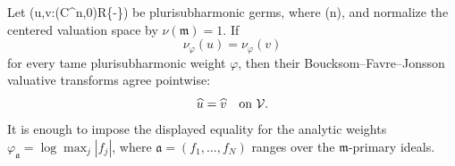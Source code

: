 Let (u,v:(\mathbf C^n,0)\to\mathbf R\cup\{-\infty\}) be
plurisubharmonic germs, where (n), and normalize the centered
valuation space by \(\nu(\mathfrak m)=1\).  If
\[
              \nu_\varphi(u)=\nu_\varphi(v)
\]
for every tame plurisubharmonic weight \(\varphi\), then their
Boucksom--Favre--Jonsson valuative transforms agree pointwise:
\[
                         \widehat u=\widehat v
              \quad\hbox{on }\mathcal V.
\]
It is enough to impose the displayed equality for the analytic weights
\(\varphi_{\mathfrak a}=\log\max_j|f_j|\), where
\(\mathfrak a=(f_1,\ldots,f_N)\) ranges over the
\(\mathfrak m\)-primary ideals.
